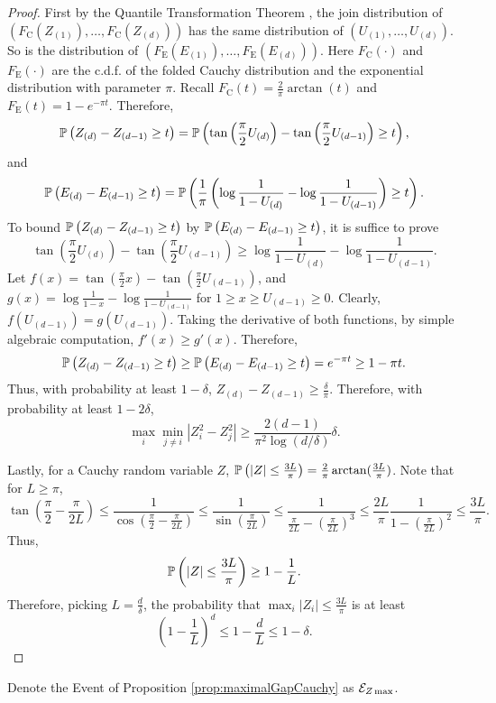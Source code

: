 \begin{proof}
First by the Quantile Transformation Theorem \citep{dasgupta2011finite}, the join distribution of \\ $(F_{\text{C}}(Z_{(1)}), \ldots, F_{\text{C}}(Z_{(d)}))$ has the same distribution of $(U_{(1)}, \ldots, U_{(d)})$. So is the distribution of $(F_{\text{E}}(E_{(1)}), \ldots, F_{\text{E}}(E_{(d)}))$. 
Here $F_{\text{C}}(\cdot)$ and $F_{\text{E}}(\cdot)$ are the c.d.f. of the folded Cauchy distribution and the exponential distribution with parameter $\pi$. 
Recall $F_{\text{C}}(t) = \frac{2}{\pi}\arctan(t)$ and $F_{\text{E}}(t) = 1-e^{-\pi t}$. 
Therefore,
\[
\mathbb{P}\left( Z_{(d)} - Z_{(d-1)} \ge t\right) = \mathbb{P}\left(\tan\left(\frac{\pi}{2}U_{(d)} \right) - \tan\left(\frac{\pi}{2}U_{(d-1)}\right) \ge t \right),
\]
and 
\[
\mathbb{P}\left(E_{(d)} - E_{(d-1)} \ge t\right) = \mathbb{P}\left(\frac{1}{\pi} \left( \log \frac{1}{1-U_{(d)}} - \log \frac{1}{1-U_{(d-1)}} \right) \ge t\right).
\]
To bound $\mathbb{P}\left( Z_{(d)} - Z_{(d-1)} \ge t\right)$ by $\mathbb{P}\left(E_{(d)} - E_{(d-1)} \ge t\right)$, it is suffice to prove 
\[
\tan\left(\frac{\pi}{2}U_{(d)} \right) - \tan\left(\frac{\pi}{2}U_{(d-1)}\right) \ge \log \frac{1}{1-U_{(d)}} - \log \frac{1}{1-U_{(d-1)}} .
\] 
Let $f(x) = \tan\left(\frac{\pi}{2}x \right) - \tan\left(\frac{\pi}{2}U_{(d-1)}\right)$, and $g(x) = \log \frac{1}{1-x} - \log \frac{1}{1-U_{(d-1)}}$ for $1\ge x\ge U_{(d-1)}\ge 0 $.
Clearly, $f(U_{(d-1)}) = g(U_{(d-1)})$. Taking the derivative of both functions, by simple algebraic computation, $f'(x) \ge g'(x)$.
Therefore,
\[
\mathbb{P}\left( Z_{(d)} - Z_{(d-1)} \ge t\right) \ge \mathbb{P}\left(E_{(d)} - E_{(d-1)} \ge t\right) = e^{-\pi t} \ge 1-\pi t.
\]
Thus, with probability at least $1-\delta$, $Z_{(d)} - Z_{(d-1)} \ge \frac{\delta}{\pi}$.
Therefore, with probability at least $1-2\delta$,
\[
\max_i \min_{j\neq i} |Z_i^2 - Z_j^2| \ge \frac{2(d-1)}{\pi^2 \log(d/\delta)}\delta.
\]

Lastly, for a Cauchy random variable $Z$, $\mathbb{P}\left(|Z|\le \frac{3L}{\pi}\right)  = \frac{2}{\pi}\arctan(\frac{3L}{\pi})$.
Note that for $L\ge \pi$,
\[
\tan(\frac{\pi}{2} - \frac{\pi}{2L}) \le \frac{1}{\cos (\frac{\pi}{2} - \frac{\pi}{2L})} \le \frac{1}{\sin(\frac{\pi}{2L})}\le \frac{1}{\frac{\pi}{2L} - \left( \frac{\pi}{2L}\right)^3}\le \frac{2L}{\pi} \frac{1}{1 - \left(\frac{\pi}{2L}\right)^2} \le \frac{3L}{\pi}.
\]
Thus, 
\[
\mathbb{P}\left(|Z|\le \frac{3L}{\pi}\right)  \ge 1 - \frac{1}{L}.
\]
Therefore, picking $L = \frac{d}{\delta}$, the probability that $\max_i |Z_i| \le \frac{3L}{\pi}$ is at least 
\[
\left(1-\frac{1}{L}\right)^d \le 1-\frac{d}{L} \le 1-\delta.
\]
\end{proof}
Denote the Event of Proposition \ref{prop:maximalGapCauchy} as $\mathcal{E}_{Z\max}$.
